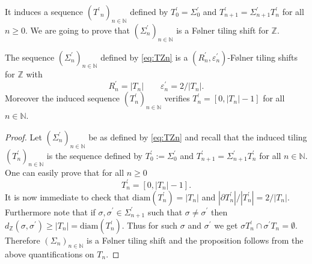 \documentclass[english, 11pt, a4paper]{article}
\theoremstyle{definition}
\numberwithin{equation}{section}
\newcommand{\bN}{\mathbb{N}}
\newcommand{\bZ}{\mathbb{Z}}
\newcommand{\diam}[1]{\mathrm{diam}\left( {#1} \right)}
\newcommand{\TZ}{T^\prime}
\newcommand{\SZ}{\Sigma^\prime}
\newcommand{\RZ}{R^\prime}
\newcommand{\epsZ}{\varepsilon^\prime}
\begin{document}
It induces a sequence $({\TZ}_n)_{n\in \bN}$ defined by $\TZ_0=\SZ_0$ and
$\TZ_{n+1}=\SZ_{n+1}\TZ_n$ for all $n\geq 0$. We are going to prove that
$(\SZ_n)_{n\in \bN}$ is a Følner tiling shift for $\bZ$.

\begin{Prop}\label{Prop:FOTSZ}
  The sequence $(\SZ_n)_{n\in \bN}$ defined by \cref{eq:TZn} is a $(\RZ_n, \epsZ_n)$-Følner
  tiling shifts for $\bZ$ with
  \begin{equation*}
    \RZ_n= \left\vert{T_n}\right\vert \qquad \epsZ_n={2}/{\vert T_n \vert}.
  \end{equation*}
  Moreover the induced sequence $(\TZ_n)_{n\in \bN}$ verifies $\TZ_n=\left[ 0,
    \left\vert{T_n}\right\vert -1 \right]$ for all $n \in \bN$. 
\end{Prop}
\begin{proof} Let $(\SZ_n)_{n\in \bN}$ be as defined by \cref{eq:TZn} and recall that the
  induced tiling $(\TZ_n)_{n\in \bN}$ is the sequence defined by $\TZ_0:=\SZ_0$ and 
  $\TZ_{n+1}=\SZ_{n+1} \TZ_n$ for all $n \in \bN$.
  One can easily prove that for all $n\geq 0$
  \begin{equation}
    \TZ_n= \left[ 0, \left\vert{T_n}\right\vert -1 \right]. 
  \end{equation}
  It is now immediate to check that $\diam{\TZ_n}=|T_n|$ and $|\partial \TZ_n
  |/|\TZ_n|=2/|T_n|$. Furthermore note that if $\sigma, \sigma^\prime \in
  \SZ_{n+1}$ such that $\sigma\neq \sigma^{\prime}$ then
  $d_{\bZ}(\sigma,\sigma^\prime)\geq |T_n|=\diam{\TZ_n}$. Thus for such $\sigma$
  and 
  $\sigma^\prime$ we get $\sigma \TZ_n \cap \sigma^\prime T_n = \emptyset$.
  Therefore $(\Sigma_n)_{n\in \bN}$ is a Følner tiling shift and the proposition follows
  from the above quantifications on $T_n$.
\end{proof}
\end{document}
